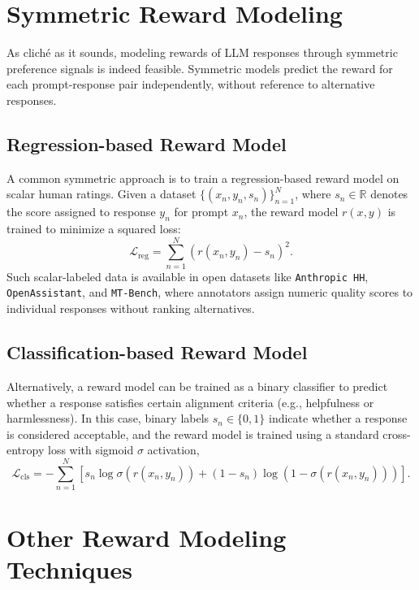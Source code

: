 \newpage
\section{Symmetric Reward Modeling}

As cliché as it sounds, modeling rewards of LLM responses through symmetric preference signals is indeed feasible. Symmetric models predict the reward for each prompt-response pair independently, without reference to alternative responses.

\subsection{Regression-based Reward Model}

A common symmetric approach is to train a regression-based reward model on scalar human ratings. Given a dataset $\{(x_n, y_n, s_n)\}_{n=1}^N$, where $s_n \in \mathbb{R}$ denotes the score assigned to response $y_n$ for prompt $x_n$, the reward model $r(x, y)$ is trained to minimize a squared loss:
\begin{equation}
    \mathcal{L}_{\text{reg}} = \sum_{n=1}^N \left(r(x_n, y_n) - s_n\right)^2.
\end{equation}
Such scalar-labeled data is available in open datasets like \texttt{Anthropic HH}, \texttt{OpenAssistant}, and \texttt{MT-Bench}, where annotators assign numeric quality scores to individual responses without ranking alternatives.

\subsection{Classification-based Reward Model}

Alternatively, a reward model can be trained as a binary classifier to predict whether a response satisfies certain alignment criteria (e.g., helpfulness or harmlessness). In this case, binary labels $s_n \in \{0, 1\}$ indicate whether a response is considered acceptable, and the reward model is trained using a standard cross-entropy loss with sigmoid $\sigma$ activation,
\begin{equation}
    \mathcal{L}_{\text{cls}} = - \sum_{n=1}^N \left[ s_n \log \sigma(r(x_n, y_n)) + (1 - s_n) \log(1 - \sigma(r(x_n, y_n))) \right].
\end{equation}


\section{Other Reward Modeling Techniques}

